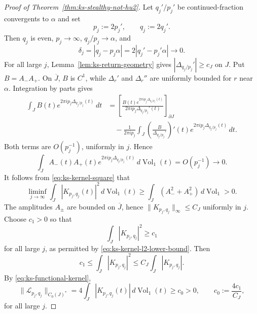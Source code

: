 \documentclass[11pt,reqno,a4paper]{amsart}
\numberwithin{equation}{section}
\theoremstyle{compact}
\theoremstyle{definition}
\theoremstyle{definition}
\newcommand{\Vol}{\operatorname{Vol}}
\begin{document}
\begin{proof}[Proof of Theorem~\ref{thm:ks-stealthy-not-hu2}]
Let $q_j'/p_j'$ be continued-fraction convergents to $\alpha$ and set
\begin{equation}\label{eq:ks-even-convergents}
  p_j:=2p_j',
  \qquad
  q_j:=2q_j'.
\end{equation}
Then $q_j$ is even, $p_j\to\infty$, $q_j/p_j\to\alpha$, and
\begin{equation}\label{eq:ks-linear-form-convergence}
  \delta_j=|q_j-p_j\alpha|
  =2|q_j'-p_j'\alpha|\longrightarrow0.
\end{equation}
For all large $j$, Lemma~\ref{lem:ks-return-geometry} gives
$|\Delta_{q_j/p_j}'|\geq c_J$ on $J$.  Put $B=A_-A_+$.  On
$\overline J$, $B$ is $C^1$, while $\Delta_r'$ and $\Delta_r''$ are uniformly
bounded for $r$ near $\alpha$.  Integration by parts gives
\begin{align*}
 \int_J B(t)e^{2\pi ip_j\Delta_{q_j/p_j}(t)}\,dt
 &=\left[
   \frac{B(t)e^{2\pi ip_j\Delta_{q_j/p_j}(t)}}
        {2\pi ip_j\Delta_{q_j/p_j}'(t)}
   \right]_{\partial J}\\
 &\quad-\frac1{2\pi ip_j}
   \int_J
   \left(\frac{B}{\Delta_{q_j/p_j}'}\right)'(t)
   e^{2\pi ip_j\Delta_{q_j/p_j}(t)}\,dt.
\end{align*}
Both terms are $O(p_j^{-1})$, uniformly in $j$.  Hence
\begin{equation}\label{eq:ks-oscillatory-cross-term}
  \int_J
    A_-(t)A_+(t)
      e^{2\pi ip_j\Delta_{q_j/p_j}(t)}\,d\Vol_1(t)
  =O(p_j^{-1})\longrightarrow0.
\end{equation}
It follows from \eqref{eq:ks-kernel-square} that
\begin{equation}\label{eq:ks-kernel-l2-lower-bound}
  \liminf_{j\to\infty}
  \int_J|K_{p_j,q_j}(t)|^2\,d\Vol_1(t)
  \geq
  \int_J(A_-^2+A_+^2)\,d\Vol_1>0.
\end{equation}
The amplitudes $A_\pm$ are bounded on $\overline J$, hence
$\|K_{p_j,q_j}\|_\infty\leq C_J$ uniformly in $j$.  Choose $c_1>0$ so that
\[
  \int_J|K_{p_j,q_j}|^2\geq c_1
\]
for all large $j$, as permitted by
\eqref{eq:ks-kernel-l2-lower-bound}.  Then
\[
  c_1
  \leq \int_J|K_{p_j,q_j}|^2
  \leq C_J\int_J|K_{p_j,q_j}|.
\]
By \eqref{eq:ks-functional-kernel},
\begin{equation}\label{eq:ks-functional-norm-lower-bound}
  \|\mathcal L_{p_j,q_j}\|_{C_0(J)^*}
  =4\int_J|K_{p_j,q_j}(t)|\,d\Vol_1(t)
  \geq c_0>0,
  \qquad c_0:=\frac{4c_1}{C_J},
\end{equation}
for all large $j$.


\end{proof}
\end{document}
